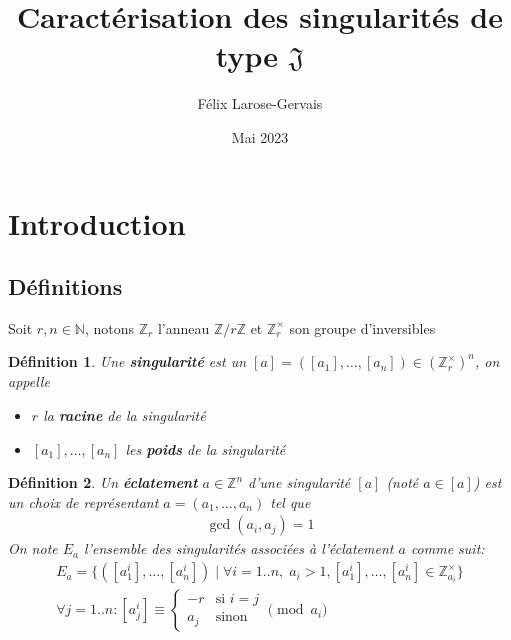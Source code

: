 \documentclass{article}
\title{Caractérisation des singularités de type $\mathfrak{J}$}
\author{Félix Larose-Gervais}
\date{Mai 2023}
\newtheorem{definition}{Définition}
\begin{document}
\maketitle

\newpage

\tableofcontents

\newpage

\section{Introduction}

\subsection{Définitions}

Soit $r, n \in \mathbb{N}$, notons $\mathbb{Z}_r$ l'anneau $\mathbb{Z}/r\mathbb{Z}$ et $\mathbb{Z}_r^\times$ son groupe d'inversibles

\begin{definition}
    Une \textbf{singularité} est un $[a] = ([a_1], \dots, [a_n]) \in (\mathbb{Z}_r^\times)^n$, on appelle \begin{itemize}
        \item $r$ la \textbf{racine} de la singularité
        \item $[a_1], \dots, [a_n]$ les \textbf{poids} de la singularité
    \end{itemize}
\end{definition}

\begin{definition}
    Un \textbf{éclatement} $a \in \mathbb{Z}^n$ d'une singularité $[a]$ (noté $a \in [a]$) est un choix de 
    représentant $a = (a_1, \dots, a_n)$ tel que
    \begin{align*}
         \gcd(a_i, a_j) = 1 \tag{$\forall i \neq j$}
    \end{align*}
    On note $E_a$ l'ensemble des singularités associées à l'éclatement $a$ comme suit:
    \begin{align*}
        E_a = \{ ([a_1^i], \dots, [a_n^i]) \mid \forall i = 1..n,\; a_i > 1, [a_1^i], \dots, [a_n^i] \in \mathbb{Z}_{a_i}^\times \} \\
        \forall j = 1..n : [a^i_j] \equiv \begin{cases}
            -r & \text{si $i = j$} \\
            a_j & \text{sinon}
        \end{cases} \pmod{a_i}
    \end{align*}
\end{definition}
\end{document}
